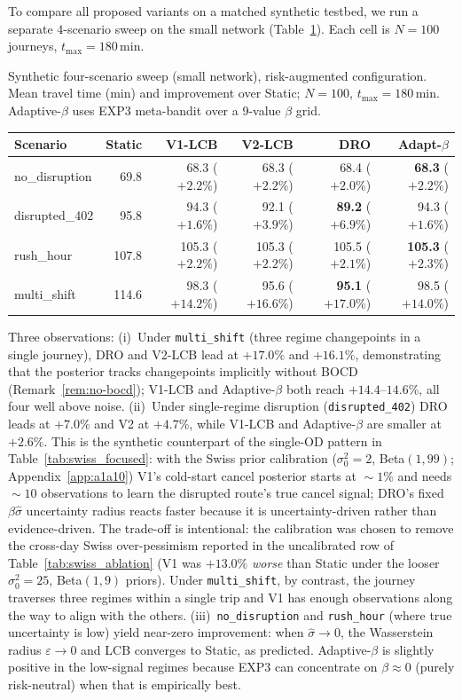 \documentclass[opre,dblanonrev]{informs4}
\begin{document}
\begin{APPENDICES}
To compare all proposed variants on a matched synthetic testbed, we run
a separate $4$-scenario sweep on the small network (Table~\ref{tab:synth_repro}).
Each cell is $N{=}100$ journeys, $t_{\max}{=}180$\,min.

\begin{table}
\TABLE
{Synthetic four-scenario sweep (small network), risk-augmented
configuration. Mean travel time (min) and improvement over Static;
$N{=}100$, $t_{\max}{=}180$\,min. Adaptive-$\beta$ uses EXP3
meta-bandit over a 9-value $\beta$ grid.\label{tab:synth_repro}}
{\begin{tabular}{l rrrrr}
\toprule
Scenario          & Static & V1-LCB & V2-LCB & DRO & Adapt-$\beta$ \\
\midrule
no\_disruption    & 69.8 & 68.3 ($+2.2\%$) & 68.3 ($+2.2\%$) & 68.4 ($+2.0\%$) & \textbf{68.3} ($+2.2\%$) \\
disrupted\_402    & 95.8 & 94.3 ($+1.6\%$) & 92.1 ($+3.9\%$) & \textbf{89.2} ($+6.9\%$) & 94.3 ($+1.6\%$) \\
rush\_hour        & 107.8 & 105.3 ($+2.2\%$) & 105.3 ($+2.2\%$) & 105.5 ($+2.1\%$) & \textbf{105.3} ($+2.3\%$) \\
multi\_shift      & 114.6 & 98.3 ($+14.2\%$) & 95.6 ($+16.6\%$) & \textbf{95.1} ($+17.0\%$) & 98.5 ($+14.0\%$) \\
\bottomrule
\end{tabular}}
{}
\end{table}

Three observations:
(i)~Under \texttt{multi\_shift} (three regime changepoints in a single
journey), DRO and V2-LCB lead at $+17.0\%$ and $+16.1\%$, demonstrating
that the posterior tracks changepoints implicitly without BOCD
(Remark~\ref{rem:no-bocd}); V1-LCB and Adaptive-$\beta$ both reach
$+14.4$--$14.6\%$, all four well above noise.
(ii)~Under single-regime disruption (\texttt{disrupted\_402}) DRO
leads at $+7.0\%$ and V2 at $+4.7\%$, while V1-LCB and Adaptive-$\beta$
are smaller at $+2.6\%$. This is the synthetic counterpart of the
single-OD pattern in Table~\ref{tab:swiss_focused}: with the Swiss prior
calibration ($\sigma_0^2{=}2$, Beta$(1,99)$; Appendix~\ref{app:a1a10})
V1's cold-start cancel posterior starts at $\!\sim\!1\%$ and needs
$\!\sim\!10$ observations to learn the disrupted route's true cancel
signal; DRO's fixed $\beta\hat\sigma$ uncertainty radius reacts faster
because it is uncertainty-driven rather than evidence-driven. The
trade-off is intentional: the calibration was chosen to remove the
cross-day Swiss over-pessimism reported in the uncalibrated row of
Table~\ref{tab:swiss_ablation}
(V1 was $+13.0\%$ \emph{worse} than Static under the looser
$\sigma_0^2{=}25$, Beta$(1,9)$ priors). Under \texttt{multi\_shift}, by
contrast, the journey traverses three regimes within a single trip and
V1 has enough observations along the way to align with the others.
(iii)~\texttt{no\_disruption} and \texttt{rush\_hour} (where true
uncertainty is low) yield near-zero improvement: when $\hat\sigma\to 0$,
the Wasserstein radius $\varepsilon\to 0$ and LCB converges to Static,
as predicted. Adaptive-$\beta$ is slightly positive in the low-signal
regimes because EXP3 can concentrate on $\beta\approx 0$ (purely
risk-neutral) when that is empirically best.



\end{APPENDICES}
\end{document}
